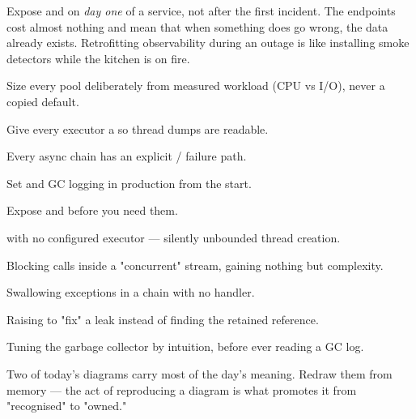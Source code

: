 \begin{seniornote}
Expose  and  on \emph{day one} of a service, not after the first incident. The endpoints cost almost nothing and mean that when something does go wrong, the data already exists. Retrofitting observability during an outage is like installing smoke detectors while the kitchen is on fire.
\end{seniornote}

\begin{bestpractices}
\begin{wbitem}
  \item Size every pool deliberately from measured workload (CPU vs I/O), never a copied default.
  \item Give every executor a  so thread dumps are readable.
  \item Every async chain has an explicit / failure path.
  \item Set  and GC logging in production from the start.
  \item Expose  and  before you need them.
\end{wbitem}
\end{bestpractices}
\begin{mistakes}
\begin{wbitem}
  \item {} with no configured executor --- silently unbounded thread creation.
  \item Blocking calls inside a "concurrent" stream, gaining nothing but complexity.
  \item Swallowing exceptions in a  chain with no handler.
  \item Raising  to "fix" a leak instead of finding the retained reference.
  \item Tuning the garbage collector by intuition, before ever reading a GC log.
\end{wbitem}
\end{mistakes}


Two of today's diagrams carry most of the day's meaning. Redraw them from memory --- the act of reproducing a diagram is what promotes it from "recognised" to "owned."

